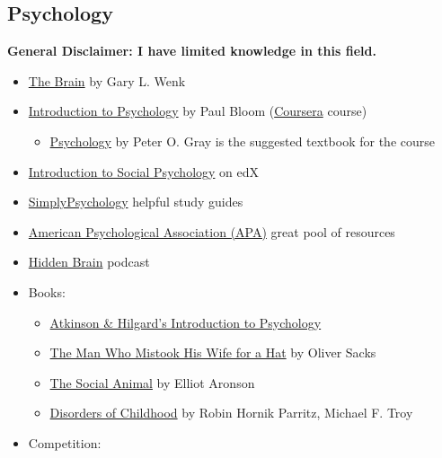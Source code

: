 \documentclass{article}
\begin{document}
\subsection{Psychology}
\textbf{General Disclaimer: I have limited knowledge in this field.}


\begin{itemize}
    \item \href{https://www.goodreads.com/book/show/34107392-the-brain}{The Brain} by Gary L. Wenk
    \item \href{https://www.youtube.com/playlist?list=PL6A08EB4EEFF3E91F}{Introduction to Psychology} by Paul Bloom (\href{https://www.coursera.org/learn/introduction-psychology}{Coursera} course)
    \begin{itemize}
        \item \href{https://www.goodreads.com/book/show/940528.Psychology}{Psychology} by Peter O. Gray is the suggested textbook for the course
    \end{itemize}
    \item \href{https://www.edx.org/course/introduction-to-social-psychology}{Introduction to Social Psychology} on edX
    \item \href{https://www.simplypsychology.org/}{SimplyPsychology} helpful study guides
    \item \href{https://www.apa.org/research}{American Psychological Association (APA)} great pool of resources
    \item \href{https://hiddenbrain.org/}{Hidden Brain} podcast
   \item Books:
   \begin{itemize}
        \item \href{https://www.goodreads.com/book/show/6896497-atkinson-hilgard-s-introduction-to-psychology}{Atkinson \& Hilgard's Introduction to Psychology}
        \item \href{https://www.goodreads.com/book/show/63697.The_Man_Who_Mistook_His_Wife_for_a_Hat_and_Other_Clinical_Tales}{The Man Who Mistook His Wife for a Hat} by Oliver Sacks
        \item \href{https://www.goodreads.com/book/show/203968.The_Social_Animal}{The Social Animal} by Elliot Aronson
       \item \href{https://www.goodreads.com/en/book/show/16242266-disorders-of-childhood}{Disorders of Childhood} by Robin Hornik Parritz, Michael F. Troy
   \end{itemize}
   \item Competition:
   \begin{itemize}

\end{itemize}
\end{itemize}
\end{document}
